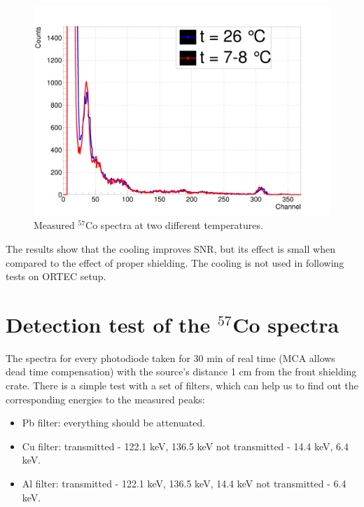 \begin{figure}[H]
 \centering
 \includegraphics[scale=0.13, angle = 0]{./pictures/TempDiff.png}
 \caption{Measured $^{57}$Co spectra at two different temperatures.}
 \label{coolspectr}
 
\end{figure}








\par
The results show that the cooling improves SNR, but its effect is small when compared to the effect of proper shielding. The cooling is not used in following tests on ORTEC setup.

\section{Detection test of the $^{57}$Co spectra}
The spectra for every photodiode taken for 30 min of real time (MCA allows dead time compensation) with the source's distance 1 cm from the front shielding crate. There is a simple test with a set of filters, which can help us to find out the corresponding energies to the measured peaks:

\begin{itemize}
\item Pb filter: everything should be attenuated.
\item Cu filter: transmitted - 122.1 keV, 136.5 keV not transmitted - 14.4 keV, 6.4 keV.
\item Al filter: transmitted - 122.1 keV, 136.5 keV, 14.4 keV not transmitted - 6.4 keV.
\end{itemize}

